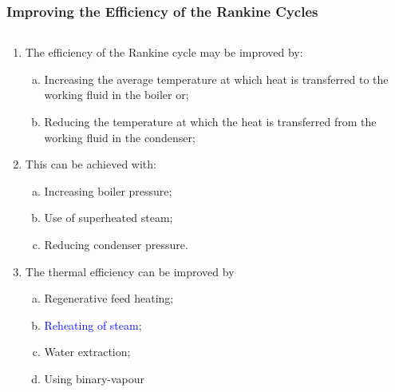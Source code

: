 \documentclass[10pt,compress]{beamer}
\newcommand{\blue}{\textcolor{blue}}
\begin{document}
\begin{frame}
 \frametitle{Improving the Efficiency of the Rankine Cycles}
   \begin{columns}
      \begin{column}[c]{0.5\linewidth}
         \begin{enumerate}\scriptsize
            \item<1-> The efficiency of the Rankine cycle may be improved by:
              \begin{enumerate}[(a)]\scriptsize
                 \item <1-> Increasing the average temperature at which heat is transferred to the working fluid in the boiler or;
                 \item <1-> Reducing the temperature at which the heat is transferred from the working fluid in the condenser;
              \end{enumerate} 
            \item <2-> This can be achieved with:
              \begin{enumerate}[(a)]\scriptsize
                 \item <2-> Increasing boiler pressure;
                 \item <2-> Use of superheated steam;
                 \item <2-> Reducing condenser pressure.
              \end{enumerate}
            \item <3-> The thermal efficiency can be improved by
              \begin{enumerate}[(a)]\scriptsize
                 \item <3-> Regenerative feed heating;
                 \item <3-> \blue{Reheating of steam};
                 \item <3-> Water extraction;
                 \item <3-> Using binary-vapour
              \end{enumerate}
         \end{enumerate}  
      \end{column}
      \begin{column}[c]{0.5\linewidth}
\end{column}
\end{columns}
\end{frame}
\end{document}

